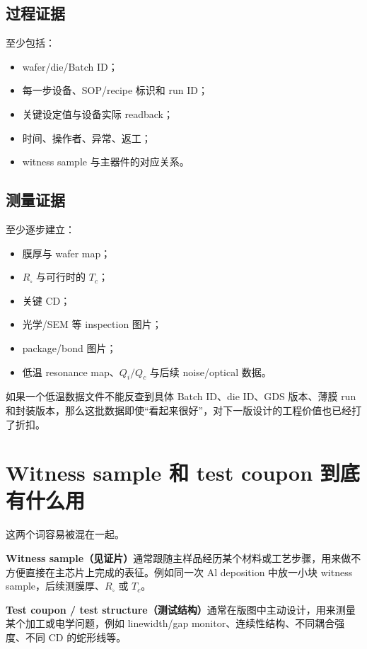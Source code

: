 \subsection{过程证据}

至少包括：

\begin{itemize}
  \item wafer/die/Batch ID；
  \item 每一步设备、SOP/recipe 标识和 run ID；
  \item 关键设定值与设备实际 readback；
  \item 时间、操作者、异常、返工；
  \item witness sample 与主器件的对应关系。
\end{itemize}

\subsection{测量证据}

至少逐步建立：

\begin{itemize}
  \item 膜厚与 wafer map；
  \item $R_\square$ 与可行时的 $T_c$；
  \item 关键 CD；
  \item 光学/SEM 等 inspection 图片；
  \item package/bond 图片；
  \item 低温 resonance map、$Q_i/Q_c$ 与后续 noise/optical 数据。
\end{itemize}

\begin{measurebox}
如果一个低温数据文件不能反查到具体 Batch ID、die ID、GDS 版本、薄膜 run 和封装版本，那么这批数据即使“看起来很好”，对下一版设计的工程价值也已经打了折扣。
\end{measurebox}

\section{Witness sample 和 test coupon 到底有什么用}

这两个词容易被混在一起。

\textbf{Witness sample（见证片）}通常跟随主样品经历某个材料或工艺步骤，用来做不方便直接在主芯片上完成的表征。例如同一次 Al deposition 中放一小块 witness sample，后续测膜厚、$R_\square$ 或 $T_c$。

\textbf{Test coupon / test structure（测试结构）}通常在版图中主动设计，用来测量某个加工或电学问题，例如 linewidth/gap monitor、连续性结构、不同耦合强度、不同 CD 的蛇形线等。

